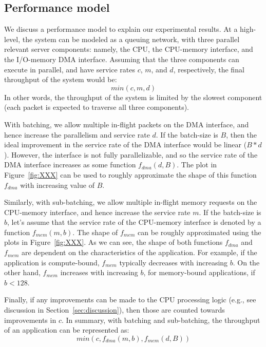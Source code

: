 \subsection{Performance model}
We discuss a performance model to explain our experimental results. At a high-level,
the system can be modeled as a queuing network, with three parallel relevant
server components: namely,
the CPU, the CPU-memory interface, and the I/O-memory DMA interface. Assuming that
the three components
can execute in parallel, and have service rates $c$, $m$, and $d$, respectively, the
final throughput of the system would be:
$$
min(c, m, d)
$$
In other words, the throughput of the system is limited by the slowest component (each
packet is expected to traverse all three components).

With batching, we allow multiple in-flight packets on the DMA interface, and
hence increase the parallelism and service rate $d$. If the batch-size is $B$, then
the ideal improvement in the service rate of the DMA interface would be linear ($B*d$).
However, the interface is not fully parallelizable, and so the service rate of
the DMA interface increases as some function $f_{dma}(d, B)$. The plot in Figure~\ref{fig:XXX}
can be used to roughly approximate the shape of this function $f_{dma}$ with increasing value of $B$.

Similarly, with sub-batching, we allow multiple in-flight memory requests on the
CPU-memory interface, and hence increase the service rate $m$. If the batch-size is $b$,
let's assume that the service rate of the CPU-memory interface is denoted by
a function $f_{mem}(m, b)$. The shape of $f_{mem}$ can be roughly approximated using
the plots in Figure~\ref{fig:XXX}. As we can see, the shape of both functions $f_{dma}$
and $f_{mem}$ are dependent on the characteristics of the application. For example,
if the application is compute-bound, $f_{mem}$ typically decreases with increasing $b$.
On the other hand, $f_{mem}$ increases with increasing $b$, for memory-bound applications,
if $b<128$.

Finally, if any improvements can be made to the CPU processing logic (e.g., see discussion
in Section~\ref{sec:discussion}), then those
are counted towards improvements in $c$. In summary, with batching and sub-batching, the
throughput of an application can be represented as:
$$
min(c, f_{dma}(m, b), f_{mem}(d, B))
$$


